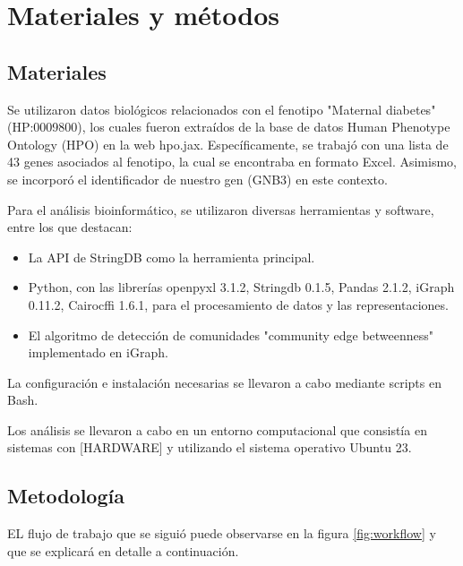 \section{Materiales y métodos}

\subsection{Materiales}
Se utilizaron datos biológicos relacionados con el fenotipo "Maternal diabetes" (HP:0009800), los cuales fueron extraídos de la base de datos Human Phenotype Ontology (HPO) en la web hpo.jax\cite{Kohler2017}. Específicamente, se trabajó con una lista de 43 genes asociados al fenotipo, la cual se encontraba en formato Excel. Asimismo, se incorporó el identificador de nuestro gen (GNB3) en este contexto.

Para el análisis bioinformático, se utilizaron diversas herramientas y software, entre los que destacan:

\begin{itemize}
	\item La API de StringDB\cite{Szklarczyk2015} como la herramienta principal.
	\item Python, con las librerías openpyxl 3.1.2, Stringdb 0.1.5\cite{Mering2005}, Pandas 2.1.2\cite{McKinney2015}, iGraph 0.11.2\cite{Csardi2006}, Cairocffi 1.6.1, para el procesamiento de datos y las representaciones.
	\item El algoritmo de detección de comunidades "community edge betweenness"~\cite{Girvan2002} implementado en iGraph.
\end{itemize}

La configuración e instalación necesarias se llevaron a cabo mediante scripts en Bash\cite{Dong2023}.

Los análisis se llevaron a cabo en un entorno computacional que consistía en sistemas con [HARDWARE] y utilizando el sistema operativo Ubuntu 23.

\subsection{Metodología}

EL flujo de trabajo que se siguió puede observarse en la figura \ref{fig:workflow} y que se explicará en detalle a continuación.

